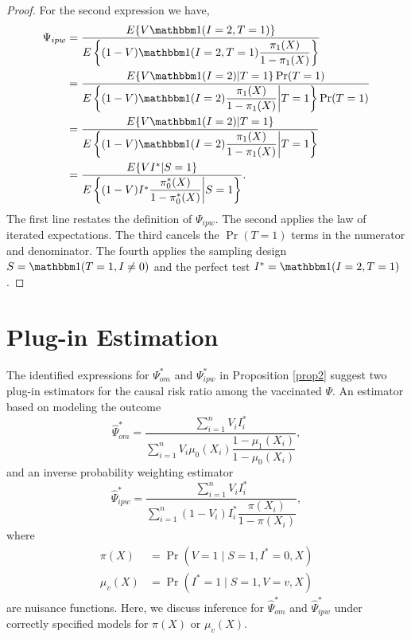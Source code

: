\begin{appendix}
\begin{proof}
    For the second expression we have,
    \begin{align*}
        \Psi_{ipw} &= \dfrac{E\{V \mathbbm 1 (I = 2, T = 1)\}}{E\left\{ (1 - V) \mathbbm 1(I = 2, T = 1) \dfrac{\pi_1(X)}{1 - \pi_1(X)}\right\}} \\
        &= \dfrac{E\{V \mathbbm 1 (I = 2) | T = 1\} \Pr(T = 1)}{E\left\{ (1 - V) \mathbbm 1(I = 2) \dfrac{\pi_1(X)}{1 - \pi_1(X)} \bigg| T = 1\right\} \Pr(T = 1)} \\
        &= \dfrac{E\{V \mathbbm 1 (I = 2) | T = 1\}}{E\left\{ (1 - V) \mathbbm 1(I = 2) \dfrac{\pi_1(X)}{1 - \pi_1(X)} \bigg| T = 1\right\}} \\
        &= \dfrac{E\{VI^*|S =1\}}{E\left\{ (1 - V) I^* \dfrac{\pi^*_0(X)}{1 - \pi^*_0(X)} \bigg| S = 1\right\}}.
    \end{align*}
    The first line restates the definition of $\Psi_{ipw}$. The second applies the law of iterated expectations. The third cancels the $\Pr(T = 1)$ terms in the numerator and denominator. The fourth applies the sampling design $S = \mathbbm 1 (T = 1, I \neq 0)$ and the perfect test $I^* = \mathbbm 1(I = 2, T=1)$.
    \end{proof}
    
    \newpage
    \section{Plug-in Estimation}
    The identified expressions for $\Psi^*_{om}$ and $\Psi^*_{ipw}$ in Proposition \ref{prop2} suggest two plug-in estimators for the causal risk ratio among the vaccinated $\Psi$.  An estimator based on modeling the outcome
    \begin{equation}
        \widehat{\Psi}_{om}^* = \dfrac{\sum_{i=1}^n V_i I^*_i}{\sum_{i=1}^n V_i \mu_0(X_i)\dfrac{1 - \mu_1(X_i)}{1 - \mu_0(X_i)}},
    \end{equation}
    and an inverse probability weighting estimator
    \begin{equation}
        \widehat{\Psi}_{ipw}^* = \dfrac{\sum_{i=1}^n V_i I^*_i}{\sum_{i=1}^n (1 - V_i) I^*_i \dfrac{\pi(X_i)}{1 - \pi(X_i)}},
    \end{equation}
    where 
    \begin{align*}
        \pi(X) &= \Pr(V=1\mid S=1, I^*=0, X) \\
        \mu_v(X) &= \Pr(I^*=1\mid S=1, V=v, X)
    \end{align*}
    are nuisance functions. Here, we discuss inference for $\widehat{\Psi}_{om}^*$ and $\widehat{\Psi}_{ipw}^*$ under correctly specified models for $\pi(X)$ or $\mu_v(X)$. 
    \newpage

\end{appendix}
